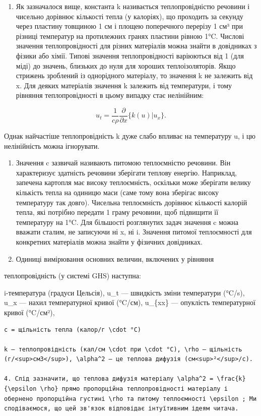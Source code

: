 \documentclass[
  ukrainian,
]{article}
\providecommand{\tightlist}{%
  \setlength{\itemsep}{0pt}\setlength{\parskip}{0pt}}
\begin{document}
\begin{enumerate}
\def\labelenumi{\arabic{enumi}.}
\tightlist
\item
  Як зазначалося вище, константа k називається теплопровідністю речовини
  і чисельно дорівнює кількості тепла (у калоріях), що проходить за
  секунду через пластину товщиною 1 см і площею поперечного перерізу 1
  см³ при різниці температур на протилежних гранях пластини рівною 1°C.
  Числові значення теплопровідності для різних матеріалів можна знайти в
  довідниках з фізики або хімії. Типові значення теплопровідності
  варіюються від 1 (для міді) до значень, близьких до нуля для хороших
  теплоізоляторів. Якщо стрижень зроблений із однорідного матеріалу, то
  значення k не залежить від x. Для деяких матеріалів значення k
  залежить від температури, і тому рівняння теплопровідності в цьому
  випадку стає нелінійним:
\end{enumerate}

\[
u_{t} = \frac{1}{c\rho} \frac{\partial}{\partial x} \{ k (u) | u_{x} \}.
\]

Однак найчастіше теплопровідність k дуже слабо впливає на температуру u,
і цю нелінійність можна ігнорувати.

\begin{enumerate}
\def\labelenumi{\arabic{enumi}.}
\setcounter{enumi}{1}
\item
  Значення c зазвичай називають питомою теплоємністю речовини. Він
  характеризує здатність речовини зберігати теплову енергію. Наприклад,
  запечена картопля має високу теплоємність, оскільки може зберігати
  велику кількість тепла на одиницю маси (саме тому вона зберігає високу
  температуру так довго). Чисельна теплоємність дорівнює кількості
  калорій тепла, які потрібно передати 1 граму речовини, щоб підвищити
  її температуру на 1°C. Для більшості розглянутих задач значення c
  можна вважати сталим, не записуючи ні x, ні i. Значення питомої
  теплоємності для конкретних матеріалів можна знайти у фізичних
  довідниках.
\item
  Одиниці вимірювання основних величин, включених у рівняння
\end{enumerate}

теплопровідність (у системі GHS) наступна:

i-температура (градуси Цельсія), u\_t --- швидкість зміни температури
(°C/s), u\_x --- нахил температурної кривої (°C/см), u\_\{xx\} ---
опуклість температурної кривої (°C/см²),

\begin{verbatim}
c = щільність тепла (калор/г \cdot °C)

k — теплопровідність (кал/см \cdot при \cdot °C), \rho — щільність (г/<sup>см3</sup>), \alpha^2 — це теплова дифузія (см<sup>²</sup>/с).

4. Слід зазначити, що теплова дифузія матеріалу \alpha^2 = \frac{k}{\epsilon \rho} прямо пропорційна теплопровідності матеріалу і обернено пропорційна густині \rho та питому теплоємності \epsilon ; Ми сподіваємося, що цей зв'язок відповідає інтуїтивним ідеям читача.
\end{verbatim}
\end{document}
